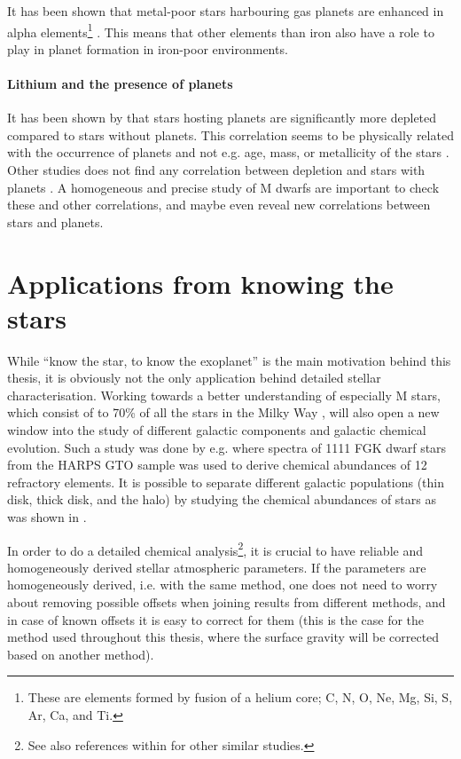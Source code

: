 It has been shown that metal-poor stars harbouring gas planets are enhanced in alpha
elements\footnote{These are elements formed by fusion of a helium core; C, N, O, Ne, Mg, Si, S, Ar,
Ca, and Ti.} \citep[see e.g.][]{Adibekyan2012a}. This means that other elements than iron also have
a role to play in planet formation in iron-poor environments.


\paragraph{Lithium and the presence of planets}

It has been shown by \citet{Israelian2004,Delgado2014,Gonzalez2015,Takeda2005} that stars hosting
planets are significantly more  depleted compared to stars without planets. This
correlation seems to be physically related with the occurrence of planets and not e.g. age, mass, or
metallicity of the stars \citep{Sousa2010}. Other studies does not find any correlation between
 depletion and stars with planets \citep{Baumann2010,Ramirez2012}.
\newline\newline
A homogeneous and precise study of M dwarfs are important to check these and other correlations, and
maybe even reveal new correlations between stars and planets.

\section{Applications from knowing the stars}
\label{sec:stars_application}

While ``know the star, to know the exoplanet'' is the main motivation behind this thesis, it is
obviously not the only application behind detailed stellar characterisation. Working towards a
better understanding of especially M stars, which consist of to 70\% of all the stars in the Milky
Way \citep{Bochanski2010}, will also open a new window into the study of different galactic
components and galactic chemical evolution. Such a study was done by e.g.
\citet{Adibekyan2012,Delgado2017} where spectra of 1111 FGK dwarf stars from the HARPS GTO sample
was used to derive chemical abundances of 12 refractory elements. It is possible to separate
different galactic populations (thin disk, thick disk, and the halo) by studying the chemical
abundances of stars as was shown in \citet{Adibekyan2012}.

In order to do a detailed chemical analysis\footnote{See also references within
\citet{Adibekyan2012} for other similar studies.}, it is crucial to have reliable and homogeneously
derived stellar atmospheric parameters. If the parameters are homogeneously derived, i.e. with the
same method, one does not need to worry about removing possible offsets when joining results from
different methods, and in case of known offsets it is easy to correct for them (this is the case for
the method used throughout this thesis, where the surface gravity will be corrected based on another
method).


